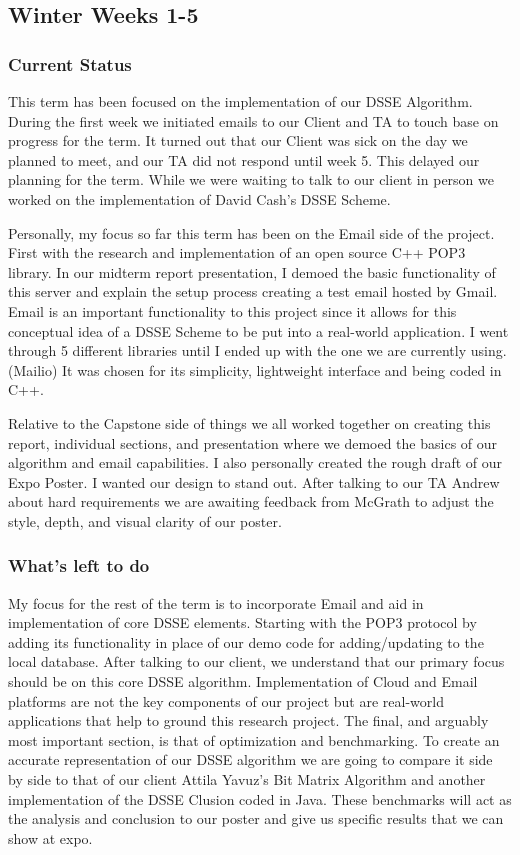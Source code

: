 \subsection{Winter Weeks 1-5}

\subsubsection{Current Status}
This term has been focused on the implementation of our DSSE Algorithm. During the first week we initiated emails to our Client and TA to touch base on progress for the term. It turned out that our Client was sick on the day we planned to meet, and our TA did not respond until week 5. This delayed our planning for the term. While we were waiting to talk to our client in person we worked on the implementation of David Cash’s DSSE Scheme. 

Personally, my focus so far this term has been on the Email side of the project. First with the research and implementation of an open source C++ POP3 library. In our midterm report presentation, I demoed the basic functionality of this server and explain the setup process creating a test email hosted by Gmail. Email is an important functionality to this project since it allows for this conceptual idea of a DSSE Scheme to be put into a real-world application. I went through 5 different libraries until I ended up with the one we are currently using. (Mailio) It was chosen for its simplicity, lightweight interface and being coded in C++.

Relative to the Capstone side of things we all worked together on creating this report, individual sections, and presentation where we demoed the basics of our algorithm and email capabilities. I also personally created the rough draft of our Expo Poster. I wanted our design to stand out. After talking to our TA Andrew about hard requirements we are awaiting feedback from McGrath to adjust the style, depth, and visual clarity of our poster.



\subsubsection{What’s left to do} 
My focus for the rest of the term is to incorporate Email and aid in implementation of core DSSE elements. Starting with the POP3 protocol by adding its functionality in place of our demo code for adding/updating to the local database. After talking to our client, we understand that our primary focus should be on this core DSSE algorithm. Implementation of Cloud and Email platforms are not the key components of our project but are real-world applications that help to ground this research project. The final, and arguably most important section, is that of optimization and benchmarking. To create an accurate representation of our DSSE algorithm we are going to compare it side by side to that of our client Attila Yavuz’s Bit Matrix Algorithm and another implementation of the DSSE Clusion coded in Java. These benchmarks will act as the analysis and conclusion to our poster and give us specific results that we can show at expo.

